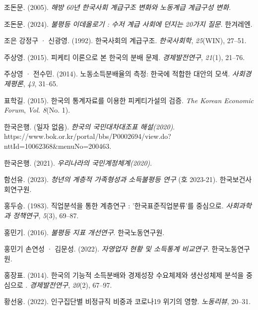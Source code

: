 \documentclass[
  letterpaper,
  DIV=11,
  numbers=noendperiod]{scrartcl}
\newlength{\cslhangindent}
\newenvironment{CSLReferences}[2] %
 {\begin{list}{}{%
  \setlength{\itemindent}{0pt}
  \setlength{\leftmargin}{0pt}
  \setlength{\parsep}{0pt}
  \ifodd #1
   \setlength{\leftmargin}{\cslhangindent}
   \setlength{\itemindent}{-1\cslhangindent}
  \fi
  \setlength{\itemsep}{#2\baselineskip}}}
 {\end{list}}
\begin{document}
\begin{CSLReferences}{1}{0}
조돈문. (2005). \emph{{해방 60년 한국사회 계급구조 변화와 노동계급
계급구성 변화}}.

조돈문. (2024). \emph{불평등 이데올로기 : 수저 계급 사회에 던지는 20가지
질문}. 한겨레엔.

조은 강정구 · 신광영. (1992). {한국사회의 계급구조}. \emph{한국사회학},
\emph{25}(WIN), 27--51.

주상영. (2015). {피케티 이론으로 본 한국의 분배 문제}.
\emph{경제발전연구}, \emph{21}(1), 21--76.

주상영 · 전수민. (2014). {노동소득분배율의 측정: 한국에 적합한 대안의
모색}. \emph{사회경제평론}, \emph{43}, 31--65.

표학길. (2015). 한국의 통계자료를 이용한 피케티가설의 검증. \emph{The
Korean Economic Forum}, \emph{Vol. 8}(No. 1).

한국은행. (일자 없음). \emph{한국의 국민대차대조표 해설(2020)}.
https://www.bok.or.kr/portal/bbs/P0002694/view.do?nttId=10062368\&menuNo=200463.

한국은행. (2021). \emph{우리나라의 국민계정체계(2020)}.

함선유. (2023). \emph{{청년의 계층적 가족형성과 소득불평등 연구}} (호
2023-21). 한국보건사회연구원.

홍두승. (1983). {직업분석을 통한 계층연구 : '한국표준직업분류'를
중심으로}. \emph{사회과학과 정책연구}, \emph{5}(3), 69--87.

홍민기. (2016). \emph{{불평등 지표 개선연구}}. 한국노동연구원.

홍민기 손연성 · 김문성. (2022). \emph{{자영업자 현황 및 소득통계
비교연구}}. 한국노동연구원.

홍장표. (2014). {한국의 기능적 소득분배와 경제성장 \texthorizontalbar{}
수요체제와 생산성체제 분석을 중심으로 \texthorizontalbar}.
\emph{경제발전연구}, \emph{20}(2), 67--97.

황선웅. (2022). {인구집단별 비정규직 비중과 코로나19 위기의 영향}.
\emph{노동리뷰}, 20--31.


\end{CSLReferences}
\end{document}
